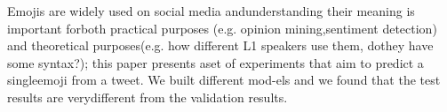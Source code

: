Emojis  are  widely  used  on  social  media  andunderstanding their meaning is important forboth practical purposes (e.g.  opinion mining,sentiment detection) and theoretical purposes(e.g.  how different L1 speakers use them, dothey have some syntax?); this paper presents aset of experiments that aim to predict a singleemoji from a tweet.   We built different mod-els and we found that the test results are verydifferent from the validation results.
